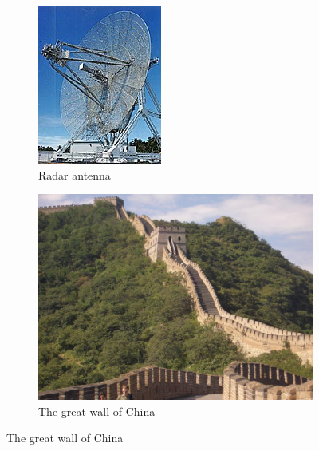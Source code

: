 \begin{figure}[ht]
    \centering 
    \begin{subfigure}[b]{0.281\textwidth} 
        \includegraphics[width=\textwidth]{figures/Radar_antenna.jpg} 
        \caption{Radar antenna} 
        \label{fig:intro_radar} 
    \end{subfigure} 
    \begin{subfigure}[b]{0.48\textwidth} 
        \includegraphics[width=\textwidth]{figures/great_wall.jpg} 
        \caption{The great wall of China} 
        \label{fig:intro_great_wall} 
    \end{subfigure} 
\end{figure}

